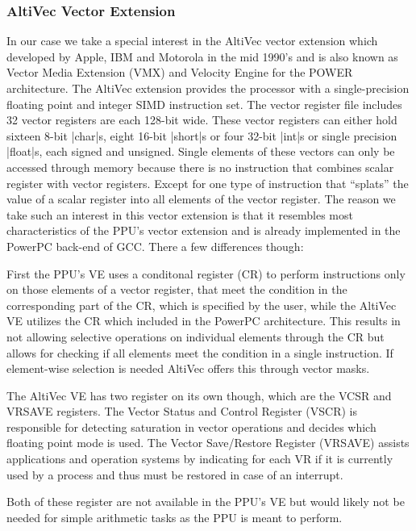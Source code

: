 \subsubsection{AltiVec Vector Extension}
In our case we take a special interest in the AltiVec vector extension which developed by Apple, IBM and Motorola in the mid 1990's and is also known as Vector Media Extension (VMX) and Velocity Engine for the POWER architecture. 
The AltiVec extension provides the processor with a single-precision floating point and integer SIMD instruction set.
The vector register file includes 32 vector registers are each 128-bit wide. 
These vector registers can either hold sixteen 8-bit |char|s, eight 16-bit |short|s or four 32-bit |int|s or single precision |float|s, each signed and unsigned.
Single elements of these vectors can only be accessed through memory because there is no instruction that combines scalar register with vector registers.
Except for one type of instruction that ``splats'' the value of a scalar register into all elements of the vector register.
The reason we take such an interest in this vector extension is that it resembles most characteristics of the PPU's vector extension and is already implemented in the PowerPC back-end of GCC.
There a few differences though:
\begin{addmargin}[2em]{0em}
    First the PPU's VE uses a conditonal register (CR) to perform instructions only on those elements of a vector register, that meet the condition in the corresponding part of the CR, which is specified by the user, while the AltiVec VE utilizes the CR which included in the PowerPC architecture.
    This results in not allowing selective operations on individual elements through the CR but allows for checking if all elements meet the condition in a single instruction.
    If element-wise selection is needed AltiVec offers this through vector masks.
    
    The AltiVec VE has two register on its own though, which are the VCSR and VRSAVE registers.
            The Vector Status and Control Register (VSCR) is responsible for detecting saturation in vector operations and decides which floating point mode is used.
            The Vector Save/Restore Register (VRSAVE) assists applications and operation systems by indicating for each VR if it is currently used by a process and thus must be restored in case of an interrupt.
    
    Both of these register are not available in the PPU's VE but would likely not be needed for simple arithmetic tasks as the PPU is meant to perform.
\end{addmargin}


